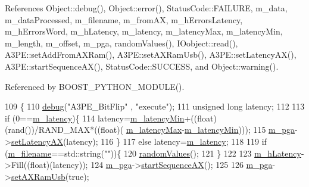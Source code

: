 References Object\+::debug(), Object\+::error(), Status\+Code\+::\+F\+A\+I\+L\+U\+RE, m\+\_\+data, m\+\_\+data\+Processed, m\+\_\+filename, m\+\_\+from\+AX, m\+\_\+h\+Errors\+Latency, m\+\_\+h\+Errors\+Word, m\+\_\+h\+Latency, m\+\_\+latency, m\+\_\+latency\+Max, m\+\_\+latency\+Min, m\+\_\+length, m\+\_\+offset, m\+\_\+pga, random\+Values(), I\+Oobject\+::read(), A3\+P\+E\+::set\+Add\+From\+A\+X\+Ram(), A3\+P\+E\+::set\+A\+X\+Ram\+Usb(), A3\+P\+E\+::set\+Latency\+A\+X(), A3\+P\+E\+::start\+Sequence\+A\+X(), Status\+Code\+::\+S\+U\+C\+C\+E\+SS, and Object\+::warning().



Referenced by B\+O\+O\+S\+T\+\_\+\+P\+Y\+T\+H\+O\+N\+\_\+\+M\+O\+D\+U\+L\+E().


\begin{DoxyCode}
109                                    \{
110   \hyperlink{classObject_aac010553f022165573714b7014a15f0d}{debug}(\textcolor{stringliteral}{"A3PE\_BitFlip"} , \textcolor{stringliteral}{"execute"});
111   \textcolor{keywordtype}{unsigned} \textcolor{keywordtype}{long} latency;    
112 
113   \textcolor{keywordflow}{if} (0==\hyperlink{classA3PE__BitFlip_a6f5ad1d6595e98c2fbd58f43e2754322}{m\_latency})\{
114         latency=\hyperlink{classA3PE__BitFlip_aeae11ece90351542cae8e0590d9162ee}{m\_latencyMin}+((float)(rand())/RAND\_MAX*((\textcolor{keywordtype}{float})(
      \hyperlink{classA3PE__BitFlip_adfeac5a7ab09d89f0d0146113dd55dde}{m\_latencyMax}-\hyperlink{classA3PE__BitFlip_aeae11ece90351542cae8e0590d9162ee}{m\_latencyMin})));
115         \hyperlink{classA3PE__BitFlip_ad20d7abccf27fa87b931cb77cd6b5e41}{m\_pga}->\hyperlink{classA3PE_a53882e1272e8146e51837904ea00f33c}{setLatencyAX}(latency);
116   \}
117   \textcolor{keywordflow}{else} latency=\hyperlink{classA3PE__BitFlip_a6f5ad1d6595e98c2fbd58f43e2754322}{m\_latency};
118 
119   \textcolor{keywordflow}{if} (\hyperlink{classA3PE__BitFlip_a72eecaff11d66c7f3eee10a9b2bfa301}{m\_filename}==std::string(\textcolor{stringliteral}{""}))\{
120       \hyperlink{classA3PE__BitFlip_a57e668f5be18f8bc53f5c105735646bf}{randomValues}();
121   \}
122   
123   \hyperlink{classA3PE__BitFlip_a83928ea28c555c19f4e95cf7863c1b0c}{m\_hLatency}->Fill((\textcolor{keywordtype}{float})(latency));
124   \hyperlink{classA3PE__BitFlip_ad20d7abccf27fa87b931cb77cd6b5e41}{m\_pga}->\hyperlink{classA3PE_a91ae249ca14676f8b0832487955fcf8c}{startSequenceAX}();
125 
126   \hyperlink{classA3PE__BitFlip_ad20d7abccf27fa87b931cb77cd6b5e41}{m\_pga}->\hyperlink{classA3PE_a77ccfbd9df2fad96a9a9f1dc579a7a2d}{setAXRamUsb}(\textcolor{keyword}{true});

\end{DoxyCode}
